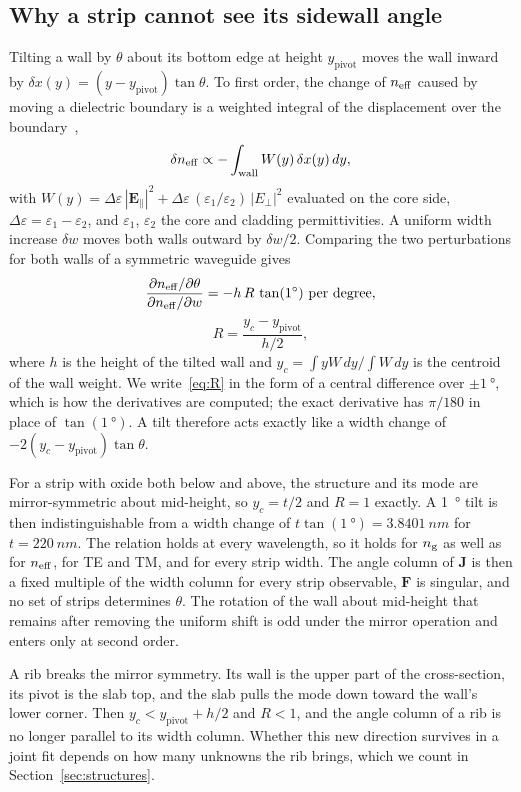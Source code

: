 \subsection{Why a strip cannot see its sidewall angle}

Tilting a wall by $\theta$ about its bottom edge at height $y_\mathrm{pivot}$ moves the wall inward by
$\delta x(y)=(y-y_\mathrm{pivot})\tan\theta$. To first order, the change of $n_\mathrm{eff}$ caused by moving a dielectric
boundary is a weighted integral of the displacement over the boundary~\cite{johnson2002},
\begin{equation}
\delta n_\mathrm{eff}\propto-\int_{\mathrm{wall}} W(y)\,\delta x(y)\,dy,
\label{eq:boundary}
\end{equation}
with $W(y)=\Delta\varepsilon\,|\mathbf{E}_\parallel|^2+\Delta\varepsilon\,(\varepsilon_1/\varepsilon_2)\,|E_\perp|^2$
evaluated on the core side, $\Delta\varepsilon=\varepsilon_1-\varepsilon_2$, and $\varepsilon_1$, $\varepsilon_2$
the core and cladding permittivities. A uniform width increase $\delta w$ moves both walls outward by $\delta w/2$.
Comparing the two perturbations for both walls of a symmetric waveguide gives
\begin{equation}
\frac{\partial n_\mathrm{eff}/\partial\theta}{\partial n_\mathrm{eff}/\partial w}=-h\,R\,\tan(\qty{1}{\degree})\ \text{per degree},
\label{eq:R}
\end{equation}
\begin{equation}
R=\frac{y_c-y_\mathrm{pivot}}{h/2},
\label{eq:Rdef}
\end{equation}
where $h$ is the height of the tilted wall and $y_c=\int yW\,dy/\int W\,dy$ is the centroid of the wall weight. We
write~\eqref{eq:R} in the form of a central difference over $\pm\qty{1}{\degree}$, which is how the derivatives are
computed; the exact derivative has $\pi/180$ in place of $\tan(\qty{1}{\degree})$. A tilt
therefore acts exactly like a width change of $-2(y_c-y_\mathrm{pivot})\tan\theta$.

For a strip with oxide both below and above, the structure and its mode are mirror-symmetric about mid-height, so
$y_c=t/2$ and $R=1$ exactly. A \qty{1}{\degree} tilt is then indistinguishable from a width change of
$t\tan(\qty{1}{\degree})=\qty{3.8401}{nm}$ for $t=\qty{220}{nm}$. The relation holds at every wavelength, so it
holds for $n_\mathrm{g}$ as well as for $n_\mathrm{eff}$, for TE and TM, and for every strip width. The angle column of $\mathbf{J}$ is
then a fixed multiple of the width column for every strip observable, $\mathbf{F}$ is singular, and no set of strips
determines $\theta$. The rotation of the wall about mid-height that remains after removing the uniform shift is odd
under the mirror operation and enters only at second order.

A rib breaks the mirror symmetry. Its wall is the upper part of the cross-section, its pivot is the slab top, and the
slab pulls the mode down toward the wall's lower corner. Then $y_c<y_\mathrm{pivot}+h/2$ and $R<1$, and the angle
column of a rib is no longer parallel to its width column. Whether this new direction survives in a joint fit depends
on how many unknowns the rib brings, which we count in Section~\ref{sec:structures}.
